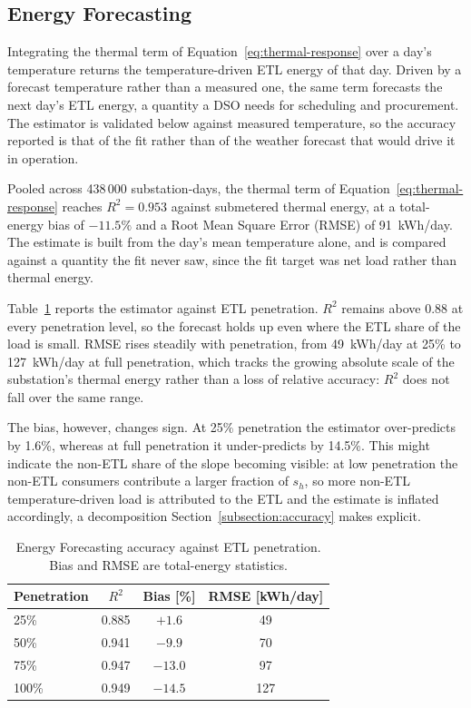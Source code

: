 \documentclass[9pt,journal,a4]{IEEEtran}
\begin{document}
\subsection{Energy Forecasting}
\label{subsection:energy}

Integrating the thermal term of Equation~\eqref{eq:thermal-response} over a day's temperature returns the temperature-driven ETL energy of that day. Driven by a forecast temperature rather than a measured one, the same term forecasts the next day's ETL energy, a quantity a DSO needs for scheduling and procurement. The estimator is validated below against measured temperature, so the accuracy reported is that of the fit rather than of the weather forecast that would drive it in operation.

Pooled across 438\,000 substation-days, the thermal term of Equation~\eqref{eq:thermal-response} reaches $R^2 = 0.953$ against submetered thermal energy, at a total-energy bias of $-11.5\%$ and a Root Mean Square Error (RMSE) of 91~kWh/day. The estimate is built from the day's mean temperature alone, and is compared against a quantity the fit never saw, since the fit target was net load rather than thermal energy.

Table~\ref{tab:energy-penetration} reports the estimator against ETL penetration. $R^2$ remains above 0.88 at every penetration level, so the forecast holds up even where the ETL share of the load is small. RMSE rises steadily with penetration, from 49~kWh/day at 25\% to 127~kWh/day at full penetration, which tracks the growing absolute scale of the substation's thermal energy rather than a loss of relative accuracy: $R^2$ does not fall over the same range.

The bias, however, changes sign. At 25\% penetration the estimator over-predicts by 1.6\%, whereas at full penetration it under-predicts by 14.5\%. This might indicate the non-ETL share of the slope becoming visible: at low penetration the non-ETL consumers contribute a larger fraction of $s_h$, so more non-ETL temperature-driven load is attributed to the ETL and the estimate is inflated accordingly, a decomposition Section~\ref{subsection:accuracy} makes explicit.

\begin{table}[t]
\centering
\caption{Energy Forecasting accuracy against ETL penetration. Bias and RMSE are total-energy statistics.}
\label{tab:energy-penetration}
\begin{tabular}{lccc}
\toprule
Penetration & $R^2$ & Bias [\%] & RMSE [kWh/day] \\
\midrule
25\%  & 0.885 & $+1.6$  & 49  \\
50\%  & 0.941 & $-9.9$  & 70  \\
75\%  & 0.947 & $-13.0$ & 97  \\
100\% & 0.949 & $-14.5$ & 127 \\
\bottomrule
\end{tabular}
\end{table}
\end{document}
